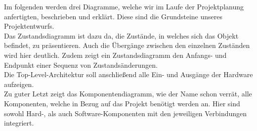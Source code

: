 \label{ArchitekturundVerhalten}

Im folgenden werden drei Diagramme, welche wir im Laufe der Projektplanung anfertigten, beschrieben und erklärt. Diese sind die Grundsteine unseres Projektentwurfs. \\
Das Zustandsdiagramm ist dazu da, die Zustände, in welches sich das Objekt befindet, zu präsentieren. Auch die Übergänge zwischen den einzelnen Zuständen wird hier deutlich. Zudem zeigt ein Zustandsdiagramm den Anfangs- und Endpunkt einer Sequenz von Zustandsänderungen. \cite[vgl. S. 120]{JosephSchmuller.2000} \\
Die Top-Level-Architektur soll anschließend alle Ein- und Ausgänge der Hardware aufzeigen. \\
Zu guter Letzt zeigt das Komponentendiagramm, wie der Name schon verrät, alle Komponenten, welche in Bezug auf das Projekt benötigt werden an. Hier sind sowohl Hard-, als auch Software-Komponenten mit den jeweiligen Verbindungen integriert.